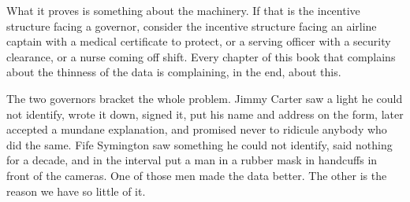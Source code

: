 What it proves is something about the machinery.  If that is the incentive structure
facing a governor, consider the incentive structure facing an airline captain with a medical
certificate to protect, or a serving officer with a security clearance, or a nurse coming off
shift. Every chapter of this book that complains about the thinness of the data is complaining,
in the end, about this.

\begin{funfact}
The two governors bracket the whole problem. Jimmy Carter saw a light he could not identify,
wrote it down, signed it, put his name and address on the form, later accepted a mundane
explanation, and promised never to ridicule anybody who did the same. Fife Symington saw
something he could not identify, said nothing for a decade, and in the interval put a man in a
rubber mask in handcuffs in front of the cameras. One of those men made the data better. The
other is the reason we have so little of it.
\end{funfact}

